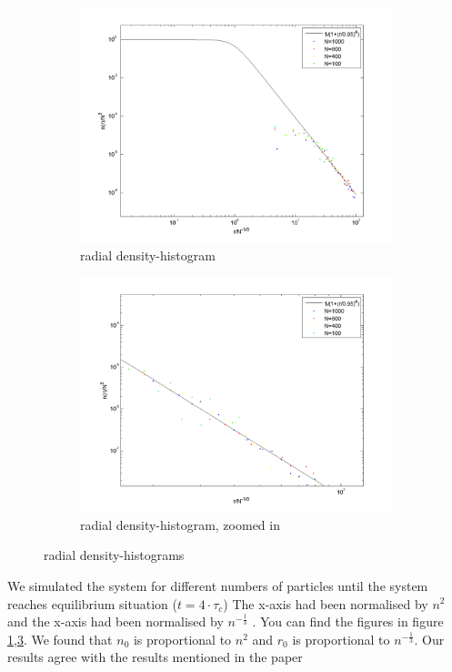 \documentclass[10pt,a4paper]{article}
\begin{document}
\begin{figure}[h]
\begin{subfigure}{0.45\textwidth}
\centering
	\includegraphics[width=\textwidth]{h.png}
	\caption{radial density-histogram \label{h}}
\end{subfigure}
\begin{subfigure}{0.45\textwidth}
\centering
\includegraphics[width=\textwidth]{h2.png}
	\caption{radial density-histogram, zoomed in \label{h2}}
\end{subfigure}
\caption{radial density-histograms}
\end{figure}
We simulated the system for different numbers of particles until the system reaches equilibrium situation ($t=4 \cdot \tau_c$) The x-axis had been normalised by $n^2$ and the x-axis had been normalised by $n^{-\frac{1}{3}}$ . You can find the figures in figure \ref{h},\ref{h2}.  We found that $n_0$ is proportional to $n^2$ and $r_0$ is proportional to $n^{-\frac{1}{3}}$. Our results agree with the results mentioned in the paper \cite{Link2}
\end{document}

